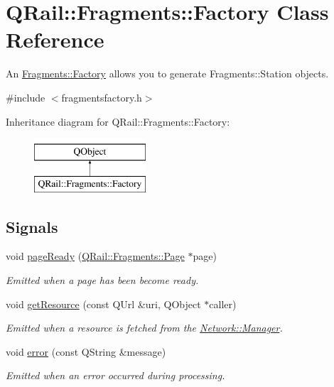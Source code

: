 \hypertarget{classQRail_1_1Fragments_1_1Factory}{}\section{Q\+Rail\+::Fragments\+::Factory Class Reference}
\label{classQRail_1_1Fragments_1_1Factory}


An \mbox{\hyperlink{classQRail_1_1Fragments_1_1Factory}{Fragments\+::\+Factory}} allows you to generate Fragments\+::\+Station objects.  




{\ttfamily \#include $<$fragmentsfactory.\+h$>$}

Inheritance diagram for Q\+Rail\+::Fragments\+::Factory\+:\begin{figure}[H]
\begin{center}
\leavevmode
\includegraphics[height=2.000000cm]{classQRail_1_1Fragments_1_1Factory}
\end{center}
\end{figure}
\subsection*{Signals}
\begin{DoxyCompactItemize}
\item 
void \mbox{\hyperlink{classQRail_1_1Fragments_1_1Factory_a1ba7147390ac01a41fd82412468d64fa}{page\+Ready}} (\mbox{\hyperlink{classQRail_1_1Fragments_1_1Page}{Q\+Rail\+::\+Fragments\+::\+Page}} $\ast$page)
\begin{DoxyCompactList}\small\item\em Emitted when a page has been become ready. \end{DoxyCompactList}\item 
void \mbox{\hyperlink{classQRail_1_1Fragments_1_1Factory_aea317c8efb3b0edfcd937935293b5988}{get\+Resource}} (const Q\+Url \&uri, Q\+Object $\ast$caller)
\begin{DoxyCompactList}\small\item\em Emitted when a resource is fetched from the \mbox{\hyperlink{classQRail_1_1Network_1_1Manager}{Network\+::\+Manager}}. \end{DoxyCompactList}\item 
void \mbox{\hyperlink{classQRail_1_1Fragments_1_1Factory_a681785e7cb92638163ad326fbb3a0c84}{error}} (const Q\+String \&message)
\begin{DoxyCompactList}\small\item\em Emitted when an error occurred during processing. \end{DoxyCompactList}\end{DoxyCompactItemize}
